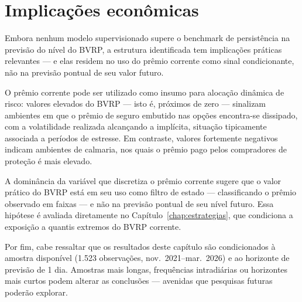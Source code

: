 \section{Implicações econômicas}
\label{sec:cap5_implicacoes}

Embora nenhum modelo supervisionado supere o benchmark de persistência na
previsão do nível do BVRP, a estrutura identificada tem implicações práticas
relevantes --- e elas residem no uso do prêmio corrente como sinal
condicionante, não na previsão pontual de seu valor futuro.

O prêmio corrente pode ser utilizado como insumo para alocação dinâmica de risco: valores elevados do BVRP --- isto é, próximos de zero --- sinalizam ambientes em que o prêmio de seguro embutido nas opções encontra-se dissipado, com a volatilidade realizada alcançando a implícita, situação tipicamente associada a períodos de estresse. Em contraste, valores fortemente negativos indicam ambientes de calmaria, nos quais o prêmio pago pelos compradores de proteção é mais elevado.

A dominância da variável que discretiza o prêmio corrente sugere que o valor
prático do BVRP está em seu uso como filtro de estado --- classificando o
prêmio observado em faixas --- e não na previsão pontual de seu nível futuro.
Essa hipótese é avaliada diretamente no Capítulo~\ref{chap:estrategias}, que
condiciona a exposição a quantis extremos do BVRP corrente.

Por fim, cabe ressaltar que os resultados deste capítulo são condicionados à
amostra disponível (1.523 observações, nov.~2021–mar.~2026) e ao horizonte de
previsão de 1 dia. Amostras mais longas, frequências intradiárias ou horizontes
mais curtos podem alterar as conclusões — avenidas que pesquisas futuras poderão
explorar.
